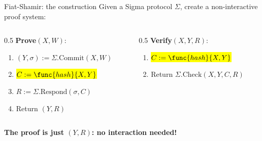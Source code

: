 \ifdefined\PRESENTATION\else\PassOptionsToClass{handout}{beamer}\fi\documentclass[aspectratio=169, lualatex]{beamer}
\begin{document}
\begin{frame}{Fiat-Shamir: the construction}
	Given a Sigma protocol $\Sigma$, create a non-interactive proof system:\\[1em]
	\begin{columns}[c]
		\begin{column}{0.5\textwidth}
			\textbf{Prove}$(X, W)$:
			\begin{enumerate}
				\item $(Y, \sigma) := \Sigma.\text{Commit}(X, W)$
				\item \hl{$C := \func{hash}{X, Y}$}
				\item $R := \Sigma.\text{Respond}(\sigma, C)$
				\item Return $(Y, R)$
			\end{enumerate}
		\end{column}
		\begin{column}{0.5\textwidth}
			\textbf{Verify}$(X, Y, R)$:
			\begin{enumerate}
				\item \hl{$C := \func{hash}{X, Y}$}
				\item Return $\Sigma.\text{Check}(X, Y, C, R)$
			\end{enumerate}
		\end{column}
	\end{columns}
	\begin{center}
		\textbf{The proof is just $(Y, R)$: no interaction needed!}
	\end{center}
\end{frame}
\end{document}
